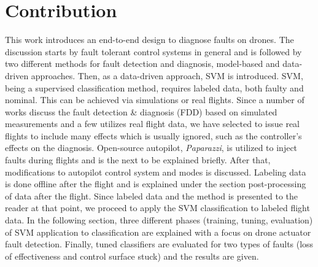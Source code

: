 \section{Contribution}

This work introduces an end-to-end design to diagnose faults on drones. 
The discussion starts by fault tolerant control systems in general and is followed by two different methods for fault detection and diagnosis, model-based and data-driven approaches. 
Then, as a data-driven approach, SVM is introduced. 
SVM, being a supervised classification method, requires labeled data, both faulty and nominal. 
This can be achieved via simulations or real flights. Since a number of works discuss the fault detection \& diagnosis (FDD) based on simulated measurements and a few utilizes real flight data, we have selected to issue real flights to include many effects which is usually ignored, such as the controller's effects on the diagnosis.
Open-source autopilot, \emph{Paparazzi}, is utilized to inject faults during flights and is the next to be explained briefly. 
After that, modifications to autopilot control system and modes is discussed. 
Labeling data is done offline after the flight and is explained under the section post-processing of data after the flight. 
Since labeled data and the method is presented to the reader at that point, we proceed to apply the SVM classification to labeled flight data. 
In the following section, three different phases (training, tuning, evaluation) of SVM application to classification are explained with a focus on drone actuator fault detection. 
Finally, tuned classifiers are evaluated for two types of faults (loss of effectiveness and control surface stuck) and the results are given.